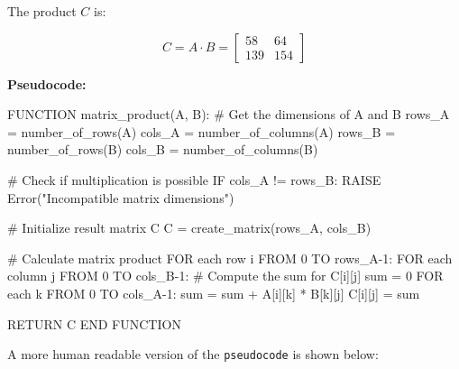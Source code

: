 \documentclass[
  letterpaper,
  DIV=11,
  numbers=noendperiod]{scrreprt}
\newenvironment{Shaded}{\begin{snugshade}}{\end{snugshade}}
\newcommand{\BuiltInTok}[1]{\textcolor[rgb]{0.00,0.23,0.31}{#1}}
\newcommand{\CommentTok}[1]{\textcolor[rgb]{0.37,0.37,0.37}{#1}}
\newcommand{\DecValTok}[1]{\textcolor[rgb]{0.68,0.00,0.00}{#1}}
\newcommand{\NormalTok}[1]{\textcolor[rgb]{0.00,0.23,0.31}{#1}}
\newcommand{\OperatorTok}[1]{\textcolor[rgb]{0.37,0.37,0.37}{#1}}
\newcommand{\StringTok}[1]{\textcolor[rgb]{0.13,0.47,0.30}{#1}}
\theoremstyle{plain}
\theoremstyle{definition}
\theoremstyle{remark}
\begin{document}
The product \(C\) is:

\[C = A \cdot B = \begin{bmatrix} 58 & 64 \\ 139 & 154 \end{bmatrix}\]

\textbf{Pseudocode:}

\begin{Shaded}
\begin{Highlighting}[]
\NormalTok{FUNCTION matrix\_product(A, B):}
    \CommentTok{\# Get the dimensions of A and B}
\NormalTok{    rows\_A }\OperatorTok{=}\NormalTok{ number\_of\_rows(A)}
\NormalTok{    cols\_A }\OperatorTok{=}\NormalTok{ number\_of\_columns(A)}
\NormalTok{    rows\_B }\OperatorTok{=}\NormalTok{ number\_of\_rows(B)}
\NormalTok{    cols\_B }\OperatorTok{=}\NormalTok{ number\_of\_columns(B)}
    
    \CommentTok{\# Check if multiplication is possible}
\NormalTok{    IF cols\_A }\OperatorTok{!=}\NormalTok{ rows\_B:}
\NormalTok{        RAISE Error(}\StringTok{"Incompatible matrix dimensions"}\NormalTok{)}
    
    \CommentTok{\# Initialize result matrix C}
\NormalTok{    C }\OperatorTok{=}\NormalTok{ create\_matrix(rows\_A, cols\_B)}
    
    \CommentTok{\# Calculate matrix product}
\NormalTok{    FOR each row i FROM }\DecValTok{0}\NormalTok{ TO rows\_A}\OperatorTok{{-}}\DecValTok{1}\NormalTok{:}
\NormalTok{        FOR each column j FROM }\DecValTok{0}\NormalTok{ TO cols\_B}\OperatorTok{{-}}\DecValTok{1}\NormalTok{:}
            \CommentTok{\# Compute the sum for C[i][j]}
            \BuiltInTok{sum} \OperatorTok{=} \DecValTok{0}
\NormalTok{            FOR each k FROM }\DecValTok{0}\NormalTok{ TO cols\_A}\OperatorTok{{-}}\DecValTok{1}\NormalTok{:}
                \BuiltInTok{sum} \OperatorTok{=} \BuiltInTok{sum} \OperatorTok{+}\NormalTok{ A[i][k] }\OperatorTok{*}\NormalTok{ B[k][j]}
\NormalTok{            C[i][j] }\OperatorTok{=} \BuiltInTok{sum}
    
\NormalTok{    RETURN C}
\NormalTok{END FUNCTION}
\end{Highlighting}
\end{Shaded}

A more human readable version of the \texttt{pseudocode} is shown below:
\end{document}
